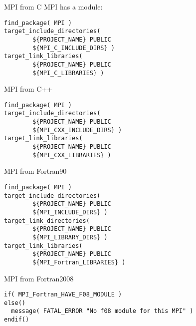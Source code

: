 

\begin{numberedframe}{MPI from C}
MPI has a module:
\begin{lstlisting}
find_package( MPI )
target_include_directories(
        ${PROJECT_NAME} PUBLIC
        ${MPI_C_INCLUDE_DIRS} )
target_link_libraries(
        ${PROJECT_NAME} PUBLIC
        ${MPI_C_LIBRARIES} )
\end{lstlisting}
\end{numberedframe}

\begin{numberedframe}{MPI from C++}
\begin{lstlisting}
find_package( MPI )
target_include_directories(
        ${PROJECT_NAME} PUBLIC
        ${MPI_CXX_INCLUDE_DIRS} )
target_link_libraries(
        ${PROJECT_NAME} PUBLIC
        ${MPI_CXX_LIBRARIES} )
\end{lstlisting}
\end{numberedframe}

\begin{numberedframe}{MPI from Fortran90}
\begin{lstlisting}
find_package( MPI )
target_include_directories(
        ${PROJECT_NAME} PUBLIC
        ${MPI_INCLUDE_DIRS} )
target_link_directories(
        ${PROJECT_NAME} PUBLIC
        ${MPI_LIBRARY_DIRS} )
target_link_libraries(
        ${PROJECT_NAME} PUBLIC
        ${MPI_Fortran_LIBRARIES} )
\end{lstlisting}
\end{numberedframe}

\begin{numberedframe}{MPI from Fortran2008}
\begin{lstlisting}
if( MPI_Fortran_HAVE_F08_MODULE )
else()
  message( FATAL_ERROR "No f08 module for this MPI" )
endif()
\end{lstlisting}
\end{numberedframe}

